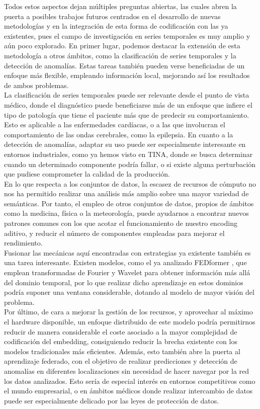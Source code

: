 Todos estos aspectos dejan múltiples preguntas abiertas, las cuales abren la puerta a posibles trabajos futuros centrados en el desarrollo de nuevas metodologías y en la integración de esta forma de codificación con las ya existentes, pues el campo de investigación en series temporales es muy amplio y aún poco explorado. En primer lugar, podemos destacar la extensión de esta metodología a otros ámbitos, como la clasificación de series temporales y la detección de anomalías. Estas tareas también pueden verse beneficiadas de un enfoque más flexible, empleando información local, mejorando así los resultados de ambos problemas.\\ La clasificación de series temporales puede ser relevante desde el punto de vista médico, donde el diagnóstico puede beneficiarse más de un enfoque que infiere el tipo de patología que tiene el paciente más que de predecir su comportamiento. Esto es aplicable a las enfermedades cardíacas, o a las que involucran el comportamiento de las ondas cerebrales, como la epilepsia. En cuanto a la detección de anomalías, adaptar su uso puede ser especialmente interesante en entornos industriales, como ya hemos visto en TINA, donde se busca determinar cuando un determinado componente podría fallar, o si existe alguna perturbación que pudiese comprometer la calidad de la producción.\\

En lo que respecta a los conjuntos de datos, la escasez de recursos de cómputo no nos ha permitido realizar una análisis más amplio sobre una mayor variedad de semánticas. Por tanto, el empleo de otros conjuntos de datos, propios de ámbitos como la medicina, física o la meteorología, puede ayudarnos a encontrar nuevos patrones comunes con los que acotar el funcionamiento de nuestro encoding aditivo, y reducir el número de componentes empleadas para mejorar el rendimiento.\\

Fusionar las mecánicas aquí encontradas con estrategias ya existente también es una tarea interesante. Existen modelos, como el ya analizado FEDformer \cite{zhou2022fedformerfrequencyenhanceddecomposed}, que emplean transformadas de Fourier y Wavelet para obtener información más allá del dominio temporal, por lo que realizar dicho aprendizaje en estos dominios podría suponer una ventana considerable, dotando al modelo de mayor visión del problema.\\

Por último, de cara a mejorar la gestión de los recursos, y aprovechar al máximo el hardware disponible, un enfoque distribuido de este modelo podría permitirnos reducir de manera considerable el coste asociado a la mayor complejidad de codificación del embedding, consiguiendo reducir la brecha existente con los modelos tradicionales más eficientes. Además, esto también abre la puerta al aprendizaje federado, con el objetivo de realizar predicciones y detección de anomalías en diferentes localizaciones sin necesidad de hacer navegar por la red los datos analizados. Esto sería de especial interés en entornos competitivos como el mundo empresarial, o en ámbitos médicos donde realizar intercambio de datos puede ser especialmente delicado por las leyes de protección de datos.\\


